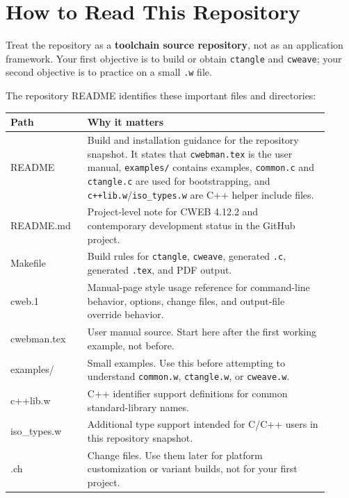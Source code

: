 \documentclass[11pt]{article}
\begin{document}
\section{How to Read This Repository}

Treat the repository as a \textbf{toolchain source repository}, not as an application framework. Your first objective is to build or obtain \texttt{ctangle} and \texttt{cweave}; your second objective is to practice on a small \texttt{.w} file.

The repository README identifies these important files and directories:

\begin{longtable}{>{\ttfamily}p{0.22\linewidth} p{0.69\linewidth}}
\toprule
\normalfont\textbf{Path} & \textbf{Why it matters} \\
\midrule
README & Build and installation guidance for the repository snapshot. It states that \texttt{cwebman.tex} is the user manual, \texttt{examples/} contains examples, \texttt{common.c} and \texttt{ctangle.c} are used for bootstrapping, and \texttt{c++lib.w}/\texttt{iso\_types.w} are C++ helper include files. \cite{repo-readme} \\
README.md & Project-level note for CWEB 4.12.2 and contemporary development status in the GitHub project. \cite{repo-readme-md} \\
Makefile & Build rules for \texttt{ctangle}, \texttt{cweave}, generated \texttt{.c}, generated \texttt{.tex}, and PDF output. \cite{repo-makefile} \\
cweb.1 & Manual-page style usage reference for command-line behavior, options, change files, and output-file override behavior. \cite{repo-manpage} \\
cwebman.tex & User manual source. Start here after the first working example, not before. \cite{repo-readme} \\
examples/ & Small examples. Use this before attempting to understand \texttt{common.w}, \texttt{ctangle.w}, or \texttt{cweave.w}. \cite{repo-readme} \\
c++lib.w & C++ identifier support definitions for common standard-library names. \cite{repo-readme,repo-cpplib} \\
iso\_types.w & Additional type support intended for C/C++ users in this repository snapshot. \cite{repo-readme} \\
*.ch & Change files. Use them later for platform customization or variant builds, not for your first project. \cite{repo-readme,repo-manpage} \\
\bottomrule
\end{longtable}
\end{document}
